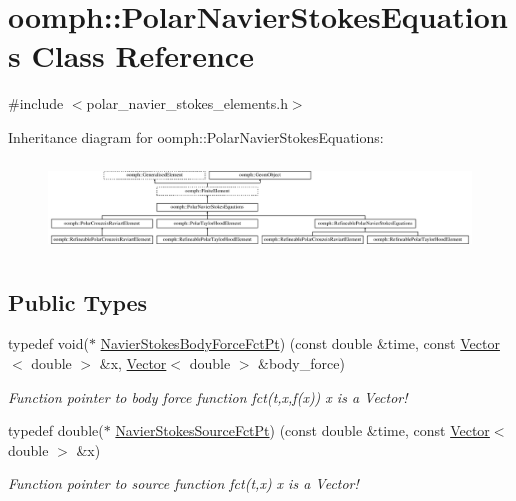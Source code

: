 \hypertarget{classoomph_1_1PolarNavierStokesEquations}{}\section{oomph\+:\+:Polar\+Navier\+Stokes\+Equations Class Reference}
\label{classoomph_1_1PolarNavierStokesEquations}


{\ttfamily \#include $<$polar\+\_\+navier\+\_\+stokes\+\_\+elements.\+h$>$}

Inheritance diagram for oomph\+:\+:Polar\+Navier\+Stokes\+Equations\+:\begin{figure}[H]
\begin{center}
\leavevmode
\includegraphics[height=2.439024cm]{classoomph_1_1PolarNavierStokesEquations}
\end{center}
\end{figure}
\subsection*{Public Types}
\begin{DoxyCompactItemize}
\item 
typedef void($\ast$ \hyperlink{classoomph_1_1PolarNavierStokesEquations_adfe008551ad8039abe5c9bf23af8c0e3}{Navier\+Stokes\+Body\+Force\+Fct\+Pt}) (const double \&time, const \hyperlink{classoomph_1_1Vector}{Vector}$<$ double $>$ \&x, \hyperlink{classoomph_1_1Vector}{Vector}$<$ double $>$ \&body\+\_\+force)
\begin{DoxyCompactList}\small\item\em Function pointer to body force function fct(t,x,f(x)) x is a Vector! \end{DoxyCompactList}\item 
typedef double($\ast$ \hyperlink{classoomph_1_1PolarNavierStokesEquations_a9084ecf962b26ccaa72443a807dedb25}{Navier\+Stokes\+Source\+Fct\+Pt}) (const double \&time, const \hyperlink{classoomph_1_1Vector}{Vector}$<$ double $>$ \&x)
\begin{DoxyCompactList}\small\item\em Function pointer to source function fct(t,x) x is a Vector! \end{DoxyCompactList}\end{DoxyCompactItemize}
